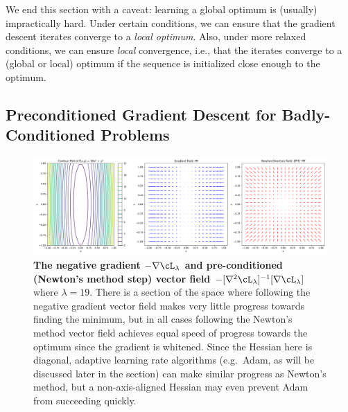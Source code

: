 \documentclass[../../book-main.tex]{subfiles}
\begin{document}
We end this section with a caveat: learning a global optimum is (usually) impractically hard. Under certain conditions, we can ensure that the gradient descent iterates converge to a \textit{local optimum}. Also, under more relaxed conditions, we can ensure \textit{local} convergence, i.e., that the iterates converge to a (global or local) optimum if the sequence is initialized close enough to the optimum.


\subsection{Preconditioned Gradient Descent for Badly-Conditioned Problems}


\begin{figure}
    \includegraphics[width=\textwidth]{chapters/appendixA/figs/hessian_geometry.png}
    \caption{\small\textbf{The negative gradient \(-\nabla \cL_{\lambda}\) and pre-conditioned (Newton's method step) vector field \(-[\nabla^{2}\cL_{\lambda}]^{-1}[\nabla \cL_{\lambda}]\)} where \(\lambda = 19\). There is a section of the space where following the negative gradient vector field makes very little progress towards finding the minimum, but in all cases following the Newton's method vector field achieves equal speed of progress towards the optimum since the gradient is whitened. Since the Hessian here is diagonal, adaptive learning rate algorithms (e.g.~Adam, as will be discussed later in the section) can make similar progress as Newton's method, but a non-axis-aligned Hessian may even prevent Adam from succeeding quickly.}
    \label{fig:hessian_geometry}
\end{figure}
\end{document}
